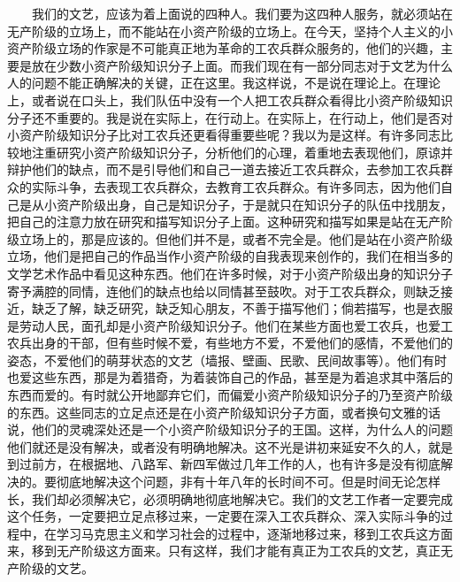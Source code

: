 \documentclass[cn,11pt,chinese]{elegantbook}
\begin{document}
　　我们的文艺，应该为着上面说的四种人。我们要为这四种人服务，就必须站在无产阶级的立场上，而不能站在小资产阶级的立场上。在今天，坚持个人主义的小资产阶级立场的作家是不可能真正地为革命的工农兵群众服务的，他们的兴趣，主要是放在少数小资产阶级知识分子上面。而我们现在有一部分同志对于文艺为什么人的问题不能正确解决的关键，正在这里。我这样说，不是说在理论上。在理论上，或者说在口头上，我们队伍中没有一个人把工农兵群众看得比小资产阶级知识分子还不重要的。我是说在实际上，在行动上。在实际上，在行动上，他们是否对小资产阶级知识分子比对工农兵还更看得重要些呢？我以为是这样。有许多同志比较地注重研究小资产阶级知识分子，分析他们的心理，着重地去表现他们，原谅并辩护他们的缺点，而不是引导他们和自己一道去接近工农兵群众，去参加工农兵群众的实际斗争，去表现工农兵群众，去教育工农兵群众。有许多同志，因为他们自己是从小资产阶级出身，自己是知识分子，于是就只在知识分子的队伍中找朋友，把自己的注意力放在研究和描写知识分子上面。这种研究和描写如果是站在无产阶级立场上的，那是应该的。但他们并不是，或者不完全是。他们是站在小资产阶级立场，他们是把自己的作品当作小资产阶级的自我表现来创作的，我们在相当多的文学艺术作品中看见这种东西。他们在许多时候，对于小资产阶级出身的知识分子寄予满腔的同情，连他们的缺点也给以同情甚至鼓吹。对于工农兵群众，则缺乏接近，缺乏了解，缺乏研究，缺乏知心朋友，不善于描写他们；倘若描写，也是衣服是劳动人民，面孔却是小资产阶级知识分子。他们在某些方面也爱工农兵，也爱工农兵出身的干部，但有些时候不爱，有些地方不爱，不爱他们的感情，不爱他们的姿态，不爱他们的萌芽状态的文艺（墙报、壁画、民歌、民间故事等）。他们有时也爱这些东西，那是为着猎奇，为着装饰自己的作品，甚至是为着追求其中落后的东西而爱的。有时就公开地鄙弃它们，而偏爱小资产阶级知识分子的乃至资产阶级的东西。这些同志的立足点还是在小资产阶级知识分子方面，或者换句文雅的话说，他们的灵魂深处还是一个小资产阶级知识分子的王国。这样，为什么人的问题他们就还是没有解决，或者没有明确地解决。这不光是讲初来延安不久的人，就是到过前方，在根据地、八路军、新四军做过几年工作的人，也有许多是没有彻底解决的。要彻底地解决这个问题，非有十年八年的长时间不可。但是时间无论怎样长，我们却必须解决它，必须明确地彻底地解决它。我们的文艺工作者一定要完成这个任务，一定要把立足点移过来，一定要在深入工农兵群众、深入实际斗争的过程中，在学习马克思主义和学习社会的过程中，逐渐地移过来，移到工农兵这方面来，移到无产阶级这方面来。只有这样，我们才能有真正为工农兵的文艺，真正无产阶级的文艺。\\
\end{document}
